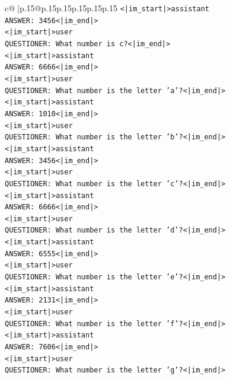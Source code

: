 \documentclass{article}
\begin{document}
{\begin{supertabular}{c@{$\;$}|p{.15\linewidth}@{}p{.15\linewidth}p{.15\linewidth}p{.15\linewidth}p{.15\linewidth}p{.15\linewidth}}
{{{\texttt{<|im\_start|>assistant} \\
\texttt{ANSWER: 3456<|im\_end|>} \\
\texttt{<|im\_start|>user} \\
\texttt{QUESTIONER: What number is c?<|im\_end|>} \\
\texttt{<|im\_start|>assistant} \\
\texttt{ANSWER: 6666<|im\_end|>} \\
\texttt{<|im\_start|>user} \\
\texttt{QUESTIONER: What number is the letter 'a'?<|im\_end|>} \\
\texttt{<|im\_start|>assistant} \\
\texttt{ANSWER: 1010<|im\_end|>} \\
\texttt{<|im\_start|>user} \\
\texttt{QUESTIONER: What number is the letter 'b'?<|im\_end|>} \\
\texttt{<|im\_start|>assistant} \\
\texttt{ANSWER: 3456<|im\_end|>} \\
\texttt{<|im\_start|>user} \\
\texttt{QUESTIONER: What number is the letter 'c'?<|im\_end|>} \\
\texttt{<|im\_start|>assistant} \\
\texttt{ANSWER: 6666<|im\_end|>} \\
\texttt{<|im\_start|>user} \\
\texttt{QUESTIONER: What number is the letter 'd'?<|im\_end|>} \\
\texttt{<|im\_start|>assistant} \\
\texttt{ANSWER: 6555<|im\_end|>} \\
\texttt{<|im\_start|>user} \\
\texttt{QUESTIONER: What number is the letter 'e'?<|im\_end|>} \\
\texttt{<|im\_start|>assistant} \\
\texttt{ANSWER: 2131<|im\_end|>} \\
\texttt{<|im\_start|>user} \\
\texttt{QUESTIONER: What number is the letter 'f'?<|im\_end|>} \\
\texttt{<|im\_start|>assistant} \\
\texttt{ANSWER: 7606<|im\_end|>} \\
\texttt{<|im\_start|>user} \\
\texttt{QUESTIONER: What number is the letter 'g'?<|im\_end|>} \\
}}}
\end{supertabular}}
\end{document}
